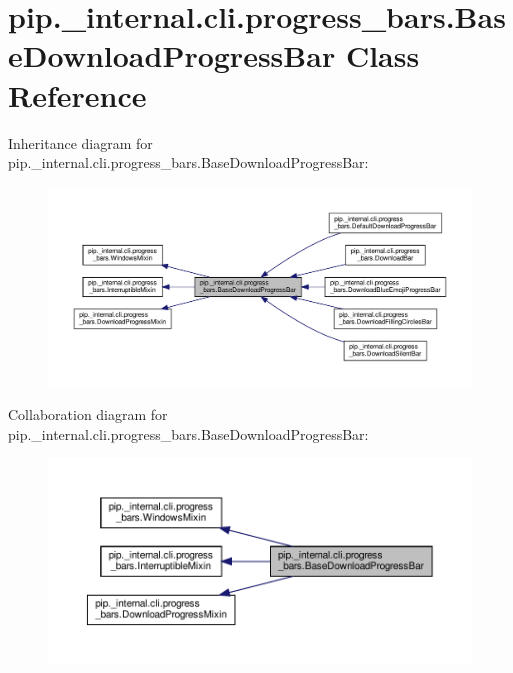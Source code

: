 \hypertarget{classpip_1_1__internal_1_1cli_1_1progress__bars_1_1BaseDownloadProgressBar}{}\section{pip.\+\_\+internal.\+cli.\+progress\+\_\+bars.\+Base\+Download\+Progress\+Bar Class Reference}
\label{classpip_1_1__internal_1_1cli_1_1progress__bars_1_1BaseDownloadProgressBar}


Inheritance diagram for pip.\+\_\+internal.\+cli.\+progress\+\_\+bars.\+Base\+Download\+Progress\+Bar\+:
\nopagebreak
\begin{figure}[H]
\begin{center}
\leavevmode
\includegraphics[width=350pt]{classpip_1_1__internal_1_1cli_1_1progress__bars_1_1BaseDownloadProgressBar__inherit__graph}
\end{center}
\end{figure}


Collaboration diagram for pip.\+\_\+internal.\+cli.\+progress\+\_\+bars.\+Base\+Download\+Progress\+Bar\+:
\nopagebreak
\begin{figure}[H]
\begin{center}
\leavevmode
\includegraphics[width=350pt]{classpip_1_1__internal_1_1cli_1_1progress__bars_1_1BaseDownloadProgressBar__coll__graph}
\end{center}
\end{figure}
